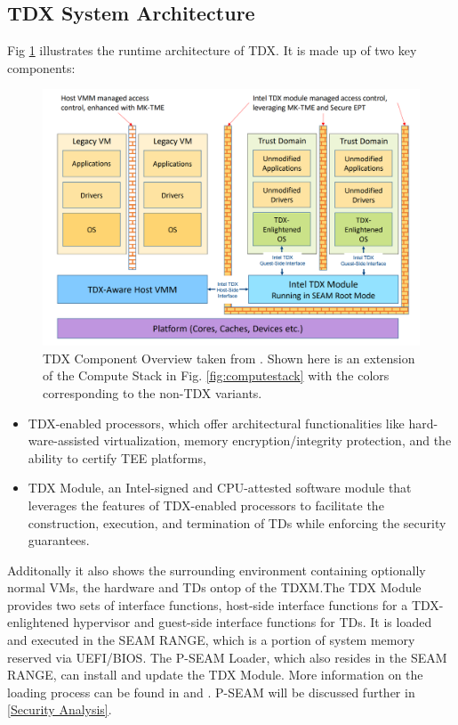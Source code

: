 \subsection{TDX System Architecture}
\label{TDX Architecture}
Fig \ref{fig:component-overview} illustrates the runtime architecture of TDX. It is made up of two key components: 
\begin{figure}
\centering
\includegraphics[width=\textwidth]{figures/TDX-Component-Overview}
\caption{TDX Component Overview taken from \cite[p.~19]{noauthor_tdx-module-10-public-specpdf_nodate}. Shown here is an extension of the Compute Stack in Fig. \ref{fig:computestack} with the colors corresponding to the non-TDX variants.}
\label{fig:component-overview}
\end{figure}
\begin{itemize}
    \item TDX-enabled processors, which offer architectural functionalities like hard-ware-assisted virtualization, memory encryption/integrity protection, and the ability to certify TEE platforms,
    \item TDX Module, an Intel-signed and CPU-attested software module that leverages the features of TDX-enabled processors to facilitate the construction, execution, and termination of TDs while enforcing the security guarantees. 
\end{itemize}
Additonally it also shows the surrounding environment containing optionally normal VMs, the hardware and TDs ontop of the TDXM.The TDX Module provides two sets of interface functions, host-side interface functions for a TDX-enlightened hypervisor and guest-side interface functions for TDs. It is loaded and executed in the SEAM RANGE, which is a portion of system memory reserved via UEFI/BIOS. The P-SEAM Loader, which also resides in the SEAM RANGE, can install and update the TDX Module. More information on the loading process can be found in \cite{noauthor_white_nodate} and \cite{noauthor_tdx-module-10-public-specpdf_nodate}. P-SEAM will be discussed further in \ref{Security Analysis}.

